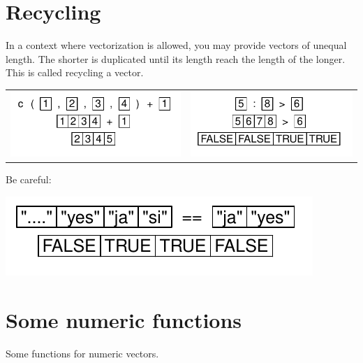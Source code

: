 \documentclass[pdflatex]{article}
\begin{document}
\section{Recycling}

In a context where vectorization is allowed, you may provide vectors of unequal length. The shorter is duplicated until its length reach the length of the longer. This is called recycling a vector.

\begin{tabular}{cc}
\includegraphics{operator_add} & \includegraphics{operator_gt}\\
\end{tabular}

Be careful:

\includegraphics{operator_recycling}

\section{Some numeric functions}

Some functions for numeric vectors.
\end{document}
